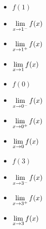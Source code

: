 \begin{ex}
\begin{enumerate}
\begin{multicols}{4}
  \end{multicols}
 
\smallskip
 
  \begin{multicols}{4}
 
 \begin{itemize}
 
 \item $f(1)$
 
 \item  $\displaystyle{ \lim_{x \rightarrow 1^{-}} f(x)}$
 
  \item  $\displaystyle{ \lim_{x \rightarrow 1^{+}} f(x)}$
 
   \item  $\displaystyle{ \lim_{x \rightarrow 1} f(x)}$
 
 \end{itemize}
 
  \end{multicols}
 
\smallskip
 
 \begin{multicols}{4}
 
 \begin{itemize}
 
 \item $f(0)$
 
 \item  $\displaystyle{ \lim_{x \rightarrow 0^{-}} f(x)}$
 
  \item  $\displaystyle{ \lim_{x \rightarrow 0^{+}} f(x)}$
 
  \item  $\displaystyle{ \lim_{x \rightarrow 0} f(x)}$
 
 \end{itemize}
 
  \end{multicols}
 
\smallskip
 
  \begin{multicols}{4}
 
 \begin{itemize}
 
 \item $f(3)$
 
 \item  $\displaystyle{ \lim_{x \rightarrow 3^{-}} f(x)}$
 
  \item  $\displaystyle{ \lim_{x \rightarrow 3^{+}} f(x)}$
 
   \item  $\displaystyle{ \lim_{x \rightarrow 3} f(x)}$
 

\end{itemize}
\end{multicols}
\end{enumerate}
\end{ex}
